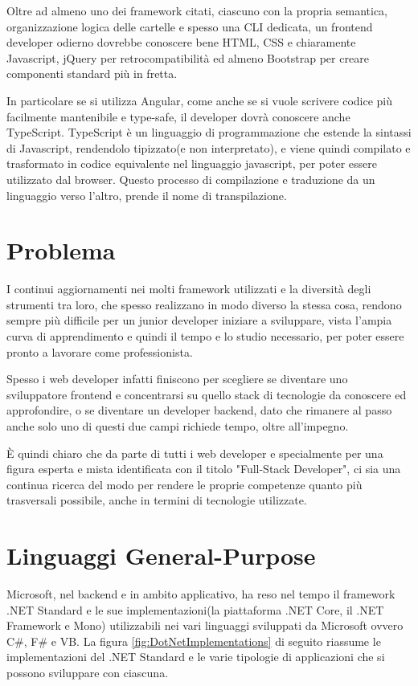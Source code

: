 Oltre ad almeno uno dei framework citati, ciascuno con la propria semantica, organizzazione logica delle cartelle e spesso una CLI dedicata, un frontend developer odierno dovrebbe conoscere bene HTML, CSS e chiaramente Javascript, jQuery per retrocompatibilit\`a ed almeno Bootstrap per creare componenti standard pi\`u in fretta.

In particolare se si utilizza Angular, come anche se si vuole scrivere codice pi\`u facilmente mantenibile e type-safe, il developer dovr\`a conoscere anche TypeScript.
TypeScript \`e un linguaggio di programmazione che estende la sintassi di Javascript, rendendolo tipizzato(e non interpretato), e viene quindi compilato e trasformato in codice equivalente nel linguaggio javascript, per poter essere utilizzato dal browser.
Questo processo di compilazione e traduzione da un linguaggio verso l'altro, prende il nome di transpilazione.

\section{Problema}\label{sez:problema}
I continui aggiornamenti nei molti framework utilizzati e la diversit\`a degli strumenti tra loro, che spesso realizzano in modo diverso la stessa cosa, rendono sempre pi\`u difficile per un junior developer iniziare a sviluppare, vista l'ampia curva di apprendimento e quindi il tempo e lo studio necessario, per poter essere pronto a lavorare come professionista.

Spesso i web developer infatti finiscono per scegliere se diventare uno sviluppatore frontend e concentrarsi su quello stack di tecnologie da conoscere ed approfondire, o se diventare un developer backend, dato che rimanere al passo anche solo uno di questi due campi richiede tempo, oltre all'impegno.

\`E quindi chiaro che da parte di tutti i web developer e specialmente per una figura esperta e mista identificata con il titolo "Full-Stack Developer", ci sia una continua ricerca del modo per rendere le proprie competenze quanto pi\`u trasversali possibile, anche in termini di tecnologie utilizzate.

\pagebreak

\section{Linguaggi General-Purpose}\label{sez:linguaggiGeneralPurpose}
Microsoft, nel backend e in ambito applicativo, ha reso nel tempo il framework .NET Standard e le sue implementazioni(la piattaforma .NET Core, il .NET Framework e Mono) utilizzabili nei vari linguaggi sviluppati da Microsoft ovvero C\#, F\# e VB.
La figura \ref{fig:DotNetImplementations} di seguito riassume le implementazioni del .NET Standard e le varie tipologie di applicazioni che si possono sviluppare con ciascuna.

